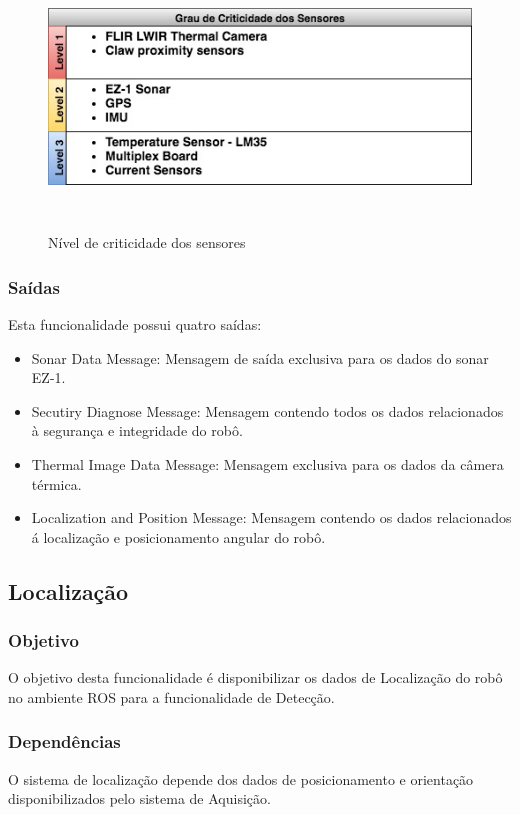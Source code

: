\begin{figure}[!ht]
	\centering
	\includegraphics[height=7cm, width=14cm]{Figures/criticidade.jpg}
	\caption{Nível de criticidade dos sensores} \label{FuncAquisition}
\end{figure}

\subsubsection{Saídas}

Esta funcionalidade possui quatro saídas:

\begin{itemize}
	\item Sonar Data Message: Mensagem de saída exclusiva para os dados do sonar EZ-1.
	\item Secutiry Diagnose Message: Mensagem contendo todos os dados relacionados à segurança e integridade do robô.
	\item Thermal Image Data Message: Mensagem exclusiva para os dados da câmera térmica.
	\item Localization and Position Message: Mensagem contendo os dados relacionados á localização e posicionamento angular do robô.
\end{itemize}

\subsection{Localização}
\label{ssec:func2}
\subsubsection{Objetivo}
O objetivo desta funcionalidade é disponibilizar os dados de Localização do robô no ambiente ROS para a funcionalidade de Detecção.

\subsubsection{Dependências}
O sistema de localização depende dos dados de posicionamento e orientação disponibilizados pelo sistema de Aquisição.

